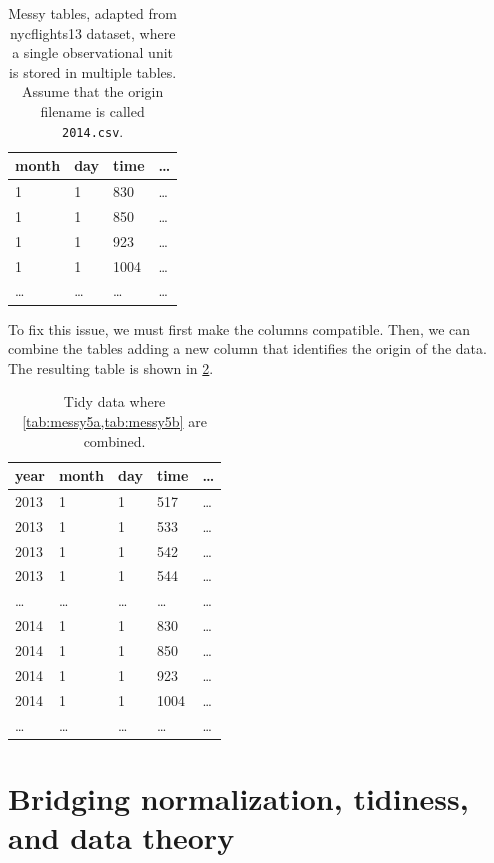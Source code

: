 \begin{table}
  \centering
  \begin{tabular}{llll}
    \toprule
    \textbf{month} & \textbf{day} & \textbf{time} & \textbf{\dots} \\
    \midrule
    1 & 1 & 830 & \dots \\
    1 & 1 & 850 & \dots \\
    1 & 1 & 923 & \dots \\
    1 & 1 & 1004 & \dots \\
    \dots & \dots & \dots & \dots \\
    \bottomrule
  \end{tabular}
  \caption{
    Messy tables, adapted from nycflights13 dataset, where a single observational unit is
    stored in multiple tables.  Assume that the origin filename is called
    \texttt{2014.csv}.
  }
  \label{tab:messy5b}
\end{table}

To fix this issue, we must first make the columns compatible.  Then, we can combine the
tables adding a new column that identifies the origin of the data.  The resulting table is
shown in \cref{tab:tidy5}.

\begin{table}
  \centering
  \begin{tabular}{lllll}
    \toprule
    \textbf{year} & \textbf{month} & \textbf{day} & \textbf{time} & \textbf{\dots} \\
    \midrule
    2013 & 1 & 1 & 517 & \dots \\
    2013 & 1 & 1 & 533 & \dots \\
    2013 & 1 & 1 & 542 & \dots \\
    2013 & 1 & 1 & 544 & \dots \\
    \dots & \dots & \dots & \dots & \dots \\
    2014 & 1 & 1 & 830 & \dots \\
    2014 & 1 & 1 & 850 & \dots \\
    2014 & 1 & 1 & 923 & \dots \\
    2014 & 1 & 1 & 1004 & \dots \\
    \dots & \dots & \dots & \dots & \dots \\
    \bottomrule
  \end{tabular}
  \caption{Tidy data where \cref{tab:messy5a,tab:messy5b} are combined.}
  \label{tab:tidy5}
\end{table}

\section{Bridging normalization, tidiness, and data theory}
\label{sub:bridge}

